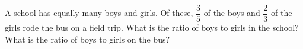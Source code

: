 A school has equally many boys and girls. Of these, $\dfrac35$ of the boys and $\dfrac23$ of the girls rode the bus on a field trip. What is the ratio of boys to girls in the school? What is the ratio of boys to girls on the bus?
